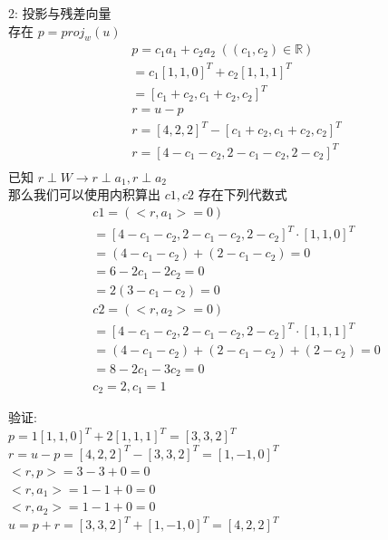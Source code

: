 \documentclass[12pt]{article}
\begin{document}
\begin{flushleft}
    2: 投影与残差向量 \\
    存在 $p = proj_{w}(u)$
    \begin{align}
        p = c_{1}a_{1} + c_{2}a_{2} \; ((c_{1},c_{2}) \in \mathbb{R}) \\
        = c_{1}[1 ,1 ,0]^{T} + c_{2}[1, 1, 1]^{T}                     \\
        =[c_{1} + c_{2}, c_{1} + c_{2}, c_{2}]^{T}                    \\
        r = u - p                                                     \\
        r = [4, 2, 2]^{T} - [c_{1} + c_{2}, c_{1} + c_{2}, c_{2}]^{T} \\
        r = [4 - c_{1}- c_{2}, 2 - c_{1}- c_{2}, 2 - c_{2}]^{T}       \\
    \end{align}
    已知 $r \perp W \rightarrow r \perp a_{1}, r \perp a_{2}$ \\
    那么我们可以使用内积算出 $c1,c2$ 存在下列代数式 \\
    \begin{align}
        c1 = (<r, a_{1}> = 0)                                                     \\
        = [4 - c_{1}- c_{2}, 2 - c_{1}- c_{2}, 2 - c_{2}]^{T} \cdot [1 ,1 ,0]^{T} \\
        = (4 - c_{1}- c_{2}) +  (2 - c_{1}- c_{2})  = 0                           \\
        =  6 - 2c_{1} -2c_{2} = 0                                                 \\
        =  2(3 - c_{1} - c_{2}) = 0                                               \\
        c2 = (<r, a_{2}> = 0)                                                     \\
        = [4 - c_{1}- c_{2}, 2 - c_{1}- c_{2}, 2 - c_{2}]^{T} \cdot [1 ,1 ,1]^{T} \\
        = (4 - c_{1}- c_{2}) +  (2 - c_{1}- c_{2})  + (2 - c_{2}) = 0             \\
        = 8 - 2c_{1} - 3c_{2} =  0                                                \\
        c_{2} = 2, c_{1} = 1
    \end{align}

    验证: \\
    $p = 1[1 ,1 ,0]^{T} + 2[1, 1, 1]^{T} = [3, 3, 2]^{T}$ \\
    $r = u - p = [4, 2, 2]^{T} - [3, 3, 2]^{T}  = [1, -1, 0]^{T} $ \\
    $<r, p> = 3 - 3 + 0 = 0 $ \\
    $<r,a_{1}> = 1 - 1 + 0 = 0$ \\
    $<r,a_{2}> = 1 - 1 + 0 = 0$ \\
    $u = p + r = [3, 3, 2]^{T} + [1, -1, 0]^{T} = [4, 2, 2]^{T}$ \\


\end{flushleft}
\end{document}
